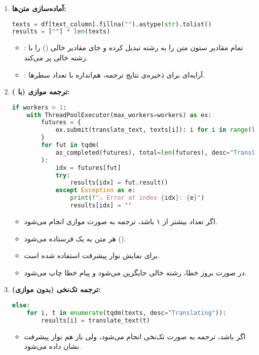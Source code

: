 \documentclass{article}
\begin{document}
\begin{enumerate}
    \item \textbf{آماده‌سازی متن‌ها:}
    \begin{latin}
    \begin{lstlisting}[language=Python]
texts = df[text_column].fillna("").astype(str).tolist()
results = [""] * len(texts)
    \end{lstlisting}
    \end{latin}
    \begin{itemize}
        \item {}: تمام مقادیر ستون متن را به رشته تبدیل کرده و جای مقادیر خالی () را با رشته خالی پر می‌کند.
        \item {}: آرایه‌ای برای ذخیره‌ی نتایج ترجمه، هم‌اندازه با تعداد سطرها.
    \end{itemize}

    \item \textbf{ترجمه موازی (با ):}
    \begin{latin}
    \begin{lstlisting}[language=Python]
if workers > 1:
    with ThreadPoolExecutor(max_workers=workers) as ex:
        futures = {
            ex.submit(translate_text, texts[i]): i for i in range(len(texts))
        }
        for fut in tqdm(
            as_completed(futures), total=len(futures), desc="Translating"
        ):
            idx = futures[fut]
            try:
                results[idx] = fut.result()
            except Exception as e:
                print(f"⚠️ Error at index {idx}: {e}")
                results[idx] = ""
    \end{lstlisting}
    \end{latin}
    \begin{itemize}
        \item اگر تعداد  بیشتر از ۱ باشد، ترجمه به صورت موازی انجام می‌شود.
        \item هر متن به یک  فرستاده می‌شود ().
        \item {} برای نمایش نوار پیشرفت استفاده شده است.
        \item در صورت بروز خطا، رشته خالی جایگزین می‌شود و پیام خطا چاپ می‌شود.
    \end{itemize}

    \item \textbf{ترجمه تک‌نخی (بدون موازی):}
    \begin{latin}
    \begin{lstlisting}[language=Python]
else:
    for i, t in enumerate(tqdm(texts, desc="Translating")):
        results[i] = translate_text(t)
    \end{lstlisting}
    \end{latin}
    \begin{itemize}
        \item اگر  باشد، ترجمه به صورت تک‌نخی انجام می‌شود، ولی باز هم نوار پیشرفت نشان داده می‌شود.
    \end{itemize}


\end{enumerate}
\end{document}
